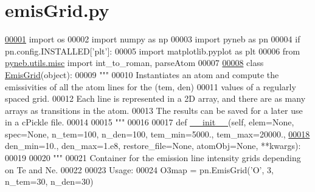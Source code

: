 \hypertarget{emis_grid_8py_source}{}\section{emis\+Grid.\+py}
\label{emis_grid_8py_source}

\begin{DoxyCode}
\hypertarget{emis_grid_8py_source_l00001}{}\hyperlink{namespacepyneb_1_1core_1_1emis_grid}{00001} \textcolor{keyword}{import} os
00002 \textcolor{keyword}{import} numpy \textcolor{keyword}{as} np
00003 \textcolor{keyword}{import} pyneb \textcolor{keyword}{as} pn
00004 \textcolor{keywordflow}{if} pn.config.INSTALLED[\textcolor{stringliteral}{'plt'}]:
00005     \textcolor{keyword}{import} matplotlib.pyplot \textcolor{keyword}{as} plt
00006 \textcolor{keyword}{from} \hyperlink{namespacepyneb_1_1utils_1_1misc}{pyneb.utils.misc} \textcolor{keyword}{import} int\_to\_roman, parseAtom
00007 
\hypertarget{emis_grid_8py_source_l00008}{}\hyperlink{classpyneb_1_1core_1_1emis_grid_1_1_emis_grid}{00008} \textcolor{keyword}{class }\hyperlink{classpyneb_1_1core_1_1emis_grid_1_1_emis_grid}{EmisGrid}(object):
00009     \textcolor{stringliteral}{"""}
00010 \textcolor{stringliteral}{    Instantiates an atom and compute the emissivities of all the atom lines for the (tem, den) }
00011 \textcolor{stringliteral}{    values of a regularly spaced grid.}
00012 \textcolor{stringliteral}{    Each line is represented in a 2D array, and there are as many arrays as transitions in the atom.}
00013 \textcolor{stringliteral}{    The results can be saved for a later use in a cPickle file.}
00014 \textcolor{stringliteral}{}
00015 \textcolor{stringliteral}{    """}
00016 
00017     \textcolor{keyword}{def }\hyperlink{classpyneb_1_1core_1_1emis_grid_1_1_emis_grid_a39c57fa6ec1619540d588cded7bbce9c}{\_\_init\_\_}(self, elem=None, spec=None, n\_tem=100, n\_den=100, tem\_min=5000., tem\_max=20000.,
\hypertarget{emis_grid_8py_source_l00018}{}\hyperlink{classpyneb_1_1core_1_1emis_grid_1_1_emis_grid_a39c57fa6ec1619540d588cded7bbce9c}{00018}                  den\_min=10., den\_max=1.e8, restore\_file=\textcolor{keywordtype}{None}, atomObj=\textcolor{keywordtype}{None}, **kwargs):
00019 
00020         \textcolor{stringliteral}{"""}
00021 \textcolor{stringliteral}{        Container for the emission line intensity grids depending on Te and Ne.}
00022 \textcolor{stringliteral}{}
00023 \textcolor{stringliteral}{        Usage:}
00024 \textcolor{stringliteral}{            O3map = pn.EmisGrid('O', 3, n\_tem=30, n\_den=30)}

\end{DoxyCode}
